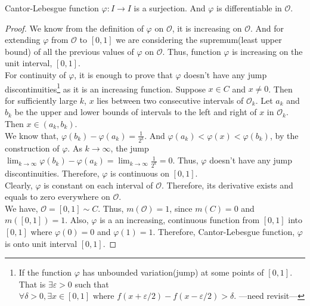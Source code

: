 \begin{theorem}
	Cantor-Lebesgue function $\varphi : I \to I$ is a surjection. And $\varphi$ is differentiable in $\mathcal{O}$.
\end{theorem}
\begin{proof}
	We know from the definition of $\varphi$ on $\mathcal{O}$, it is increasing on $\mathcal{O}$.
	And for extending $\varphi$ from $\mathcal{O}$ to $[0,1]$ we are considering the supremum(least upper bound) of all the previous values of $\varphi$ on $\mathcal{O}$.
	Thus, function $\varphi$ is increasing on the unit interval, $[0,1]$.\\

	For continuity of $\varphi$, it is enough to prove that $\varphi$ doesn't have any jump discontinuities\dag\footnote{
		If the function $\varphi$ has unbounded variation(jump) at some points of $[0,1]$.
		That is $\exists \varepsilon > 0$ such that $\forall \delta > 0, \exists x \in [0,1] \text{ where } f(x+\varepsilon/2)-f(x-\varepsilon/2) > \delta$. ---need revisit---}
	as it is an increasing function.
	Suppose $x \in C$ and $x \ne 0$.
	Then for sufficiently large $k$, $x$ lies between two consecutive intervals of $\mathcal{O}_k$.
	Let $a_k$ and $b_k$ be the upper and lower bounds of intervals to the left and right of $x$ in $\mathcal{O}_k$.
	Then $x \in (a_k,b_k)$.\\

	We know that, $\varphi(b_k)-\varphi(a_k) = \frac{1}{2^k}$.
	And $\varphi(a_k) < \varphi(x) < \varphi(b_k)$, by the construction of $\varphi$.
	As $k \to \infty$, the jump $\displaystyle \lim_{k \to \infty} \varphi(b_k)-\varphi(a_k) = \lim_{k \to \infty} \frac{1}{2^k} = 0$.
	Thus, $\varphi$ doesn't have any jump discontinuities.
	Therefore, $\varphi$ is continuous on $[0,1]$.\\

	Clearly, $\varphi$ is constant on each interval of $\mathcal{O}$.
	Therefore, its derivative exists and equals to zero everywhere on $\mathcal{O}$.\\

	We have, $\mathcal{O} = [0,1] \sim C$.
	Thus, $m(\mathcal{O}) = 1$, since $m(C) = 0$ and $m([0,1]) = 1$.
	Also, $\varphi$ is a an increasing, continuous function from $[0,1]$ into $[0,1]$ where $\varphi(0) = 0$ and $\varphi(1) = 1$.
	Therefore, Cantor-Lebesgue function, $\varphi$ is onto unit interval $[0,1]$.
\end{proof}

